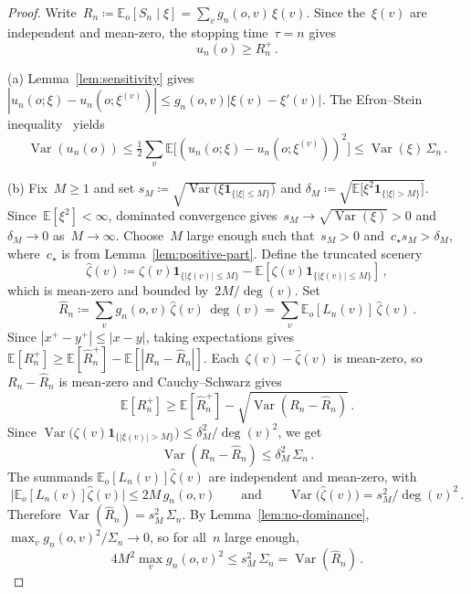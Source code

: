 \documentclass[11pt]{amsart}
\theoremstyle{plain}
\theoremstyle{definition}
\newcommand{\E}{\mathbb{E}}
\newcommand{\one}{\mathbf{1}}
\DeclareMathOperator{\var}{Var}
\begin{document}
	\begin{proof}
		Write~$R_n\coloneqq\E_o[S_n\mid\xi]=\sum_v g_n(o,v)\,\xi(v)$.
		Since the~$\xi(v)$ are independent and mean-zero, the stopping time~$\tau=n$ gives
		\begin{equation}\label{eq:un-geq-Rn+}
			u_n(o)\geq R_n^+\,.
		\end{equation}
		
		\medskip
		\textup{(a)}\;
		Lemma~\ref{lem:sensitivity} gives~$|u_n(o;\xi)-u_n(o;\xi^{(v)})|\leq g_n(o,v)|\xi(v)-\xi'(v)|$.
		The Efron--Stein inequality~\citep{EfronStein81} yields
		\[
		\var(u_n(o))\leq\tfrac{1}{2}\sum_v\E\bigl[(u_n(o;\xi)-u_n(o;\xi^{(v)}))^2\bigr]
		\leq\var(\xi)\,\Sigma_n\,.
		\]
		
		\medskip
		\textup{(b)}\;
		Fix~$M\geq 1$ and set $s_M \coloneqq \sqrt{\var\bigl(\xi\one_{\{|\xi|\leq M\}}\bigr)}$ and $\delta_M \coloneqq \sqrt{\E\bigl[\xi^2\one_{\{|\xi|>M\}}\bigr]}$. Since~$\E[\xi^2]<\infty$, dominated convergence gives~$s_M\to\sqrt{\var(\xi)}>0$ and~$\delta_M\to 0$ as~$M\to\infty$. Choose~$M$ large enough such that~$s_M>0$ and~$c_\star s_M>\delta_M$, where~$c_\star$ is from Lemma~\ref{lem:positive-part}.
		Define the truncated scenery
		\[
		\hat\zeta(v)\coloneqq\zeta(v)\one_{\{|\xi(v)|\leq M\}}-\E[\zeta(v)\one_{\{|\xi(v)|\leq M\}}]\,,
		\]
		which is mean-zero and bounded by~$2M/\deg(v)$. Set
		\[
		\hat R_n\coloneqq\sum_v g_n(o,v)\,\hat\zeta(v)\,\deg(v)=\sum_v\E_o[L_n(v)]\,\hat\zeta(v)\,.
		\]
		Since $|x^+-y^+|\leq|x-y|$, taking expectations gives $\E[R_n^+]\geq\E[\hat R_n^+]-\E[|R_n-\hat R_n|]$.
		Each~$\zeta(v)-\hat\zeta(v)$ is mean-zero, so $R_n-\hat R_n$ is mean-zero and Cauchy--Schwarz gives
		\begin{equation}\label{eq:trunc-error}
			\E[R_n^+]\geq\E[\hat R_n^+]-\sqrt{\var(R_n-\hat R_n)}\,.
		\end{equation}
		Since $\var\bigl(\zeta(v)\one_{\{|\xi(v)|>M\}}\bigr)\leq\delta_M^2/\deg(v)^2$, we get
		\begin{equation}\label{eq:trunc-var}
			\var(R_n-\hat R_n)
			\leq\delta_M^2\,\Sigma_n\,.
		\end{equation}
		The summands $\E_o[L_n(v)]\hat\zeta(v)$ are independent and mean-zero, with
		\[
		\bigl|\E_o[L_n(v)]\hat\zeta(v)\bigr|\leq 2M\,g_n(o,v)
		\qquad\text{and}\qquad
		\var\bigl(\hat\zeta(v)\bigr)=s_M^2/\deg(v)^2\,.
		\]
		Therefore $\var(\hat R_n)=s_M^2\,\Sigma_n$.
		By Lemma~\ref{lem:no-dominance}, $\max_v g_n(o,v)^2/\Sigma_n\to 0$, so for all~$n$ large enough,
		\[
		4M^2\max_vg_n(o,v)^{\!2}\leq s_M^2\,\Sigma_n=\var(\hat R_n)\,.
\]
\end{proof}
\end{document}

